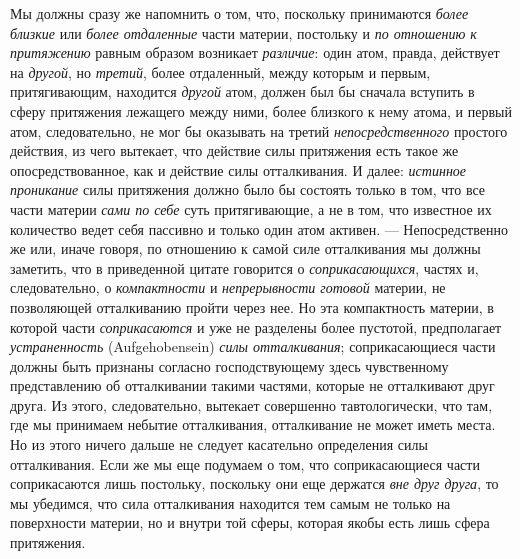 Мы должны сразу же напомнить о том, что, поскольку принимаются
{\em более близкие} или {\em более
отдаленные} части материи, постольку и {\em по
отношению к притяжению} равным образом возникает
{\em различие}: один атом, правда, действует на
{\em другой}, но {\em третий},
более отдаленный, между которым и первым, притягивающим, находится
{\em другой} атом, должен был бы сначала вступить в
сферу притяжения лежащего между ними, более близкого к нему атома, и первый
атом, следовательно, не мог бы оказывать на третий
{\em непосредственного} простого действия, из чего
вытекает, что действие силы притяжения есть такое же опосредствованное, как
и действие силы отталкивания. И далее: {\em истинное
проникание} силы притяжения должно было бы состоять только в том, что все
части материи {\em сами по себе} суть притягивающие, а
не в том, что известное их количество ведет себя пассивно и только один
атом активен. — Непосредственно же или, иначе говоря, по отношению к самой
силе отталкивания мы должны заметить, что в приведенной цитате говорится о
{\em соприкасающихся}, частях и, следовательно, о
{\em компактности} и
{\em непрерывности готовой} материи, не позволяющей
отталкиванию пройти через нее. Но эта компактность материи, в которой части
{\em соприкасаются} и уже не разделены более пустотой,
предполагает {\em устраненность} (Aufgehobensein)
{\em силы отталкивания}; соприкасающиеся части должны
быть признаны согласно господствующему здесь чувственному представлению об
отталкивании такими частями, которые не отталкивают друг друга. Из этого,
следовательно, вытекает совершенно тавтологически, что там, где мы
принимаем небытие отталкивания, отталкивание не может иметь места. Но из
этого ничего дальше не следует касательно определения силы отталкивания.
Если же мы еще подумаем о том, что соприкасающиеся части соприкасаются лишь
постольку, поскольку они еще держатся {\em вне друг
друга}, то мы убедимся, что сила отталкивания находится тем самым не только
на поверхности материи, но и внутри той сферы, которая якобы есть лишь
сфера притяжения.

